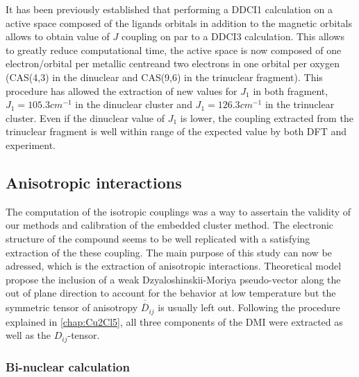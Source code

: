 \documentclass[10pt]{report}
\numberwithin{equation}{section}
\begin{document}
It has been previously established that performing a DDCI1 calculation on a active space composed of the ligands orbitals in addition to the magnetic orbitals allows to obtain value of $J$ coupling on par to a DDCI3 calculation.
This allows to greatly reduce computational time, the active space is now composed of one electron/orbital per metallic centreand two electrons in one orbital per oxygen (CAS(4,3) in the dinuclear and CAS(9,6) in the trinuclear fragment).
This procedure has allowed the extraction of new values for $J_1$ in both fragment, $J_1=105.3 cm^{-1}$ in the dinuclear cluster and $J_1=126.3 cm^{-1}$ in the trinuclear cluster.
Even if the dinuclear value of $J_1$ is lower, the coupling extracted from the trinuclear fragment is well within range of the expected value by both DFT and experiment.




\subsection{Anisotropic interactions}

The computation of the isotropic couplings was a way to assertain the validity of our methods and calibration of the embedded cluster method.
The electronic structure of the compound seems to be well replicated with a satisfying extraction of the these coupling.
The main purpose of this study can now be adressed, which is the extraction of anisotropic interactions.
Theoretical model propose the inclusion of a weak Dzyaloshinskii-Moriya pseudo-vector along the out of plane direction to account for the behavior at low temperature but the symmetric tensor of anisotropy $\overline{\overline{D}}_{ij}$ is usually left out.
Following the procedure explained in \ref{chap:Cu2Cl5}, all three components of the DMI were extracted as well as the $D_{ij}$-tensor.

\subsubsection*{Bi-nuclear calculation}
\end{document}
